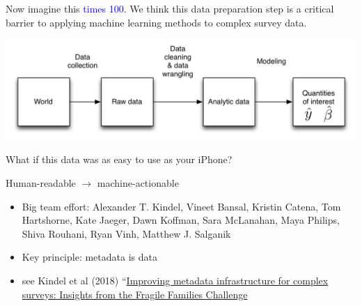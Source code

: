 \documentclass{beamer}
\begin{document}
\begin{frame}

Now imagine this \textcolor{blue}{times 100}. \pause We think this data preparation step is a critical barrier to applying machine learning methods to complex survey data.

\begin{center}
\includegraphics[width=1\textwidth]{figures/data_pipeline}
\end{center}

\end{frame}
\begin{frame}

\begin{center}
What if this data was as easy to use as your iPhone?
\end{center}

\end{frame}
\begin{frame}

\begin{center}
\Large{Human-readable $\rightarrow$ machine-actionable}
\end{center}
 
\end{frame}
\begin{frame}

\begin{itemize}
\item Big team effort: Alexander T. Kindel, Vineet Bansal, Kristin Catena, Tom Hartshorne, Kate Jaeger, Dawn Koffman, Sara McLanahan, Maya Philips, Shiva Rouhani, Ryan Vinh, Matthew J. Salganik \pause
\item Key principle: metadata is data 
\item see Kindel et al (2018) ``\href{https://osf.io/preprints/socarxiv/u8spj/}{Improving metadata infrastructure for complex surveys: Insights from the Fragile Families Challenge}
\end{itemize}

\end{frame}
\end{document}
